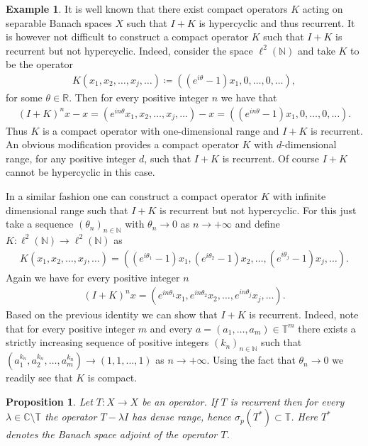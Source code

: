 \documentclass[12pt,leqno]{amsart}
\theoremstyle{plain}
\newtheorem{proposition}[equation]{Proposition}
\theoremstyle{definition}
\newtheorem{example}[equation]{Example}
\numberwithin{equation}{section}
\begin{document}
\begin{example}
	\label{ex.compact} It is well known that there exist compact operators $K$ acting on separable Banach spaces $X$ such that $I+K$ is hypercyclic and thus recurrent. It is however not difficult to construct a compact operator $K$ such that $I+K$ is recurrent but not hypercyclic. Indeed, consider the space $\ell^2(\mathbb N)$ and take $K$ to be the operator 
	\begin{align*}
		K(x_1,x_2,\ldots,x_j,\ldots)\coloneqq ((e^{i\theta}-1) x_1,0,\ldots,0,\ldots), 
	\end{align*}
	for some $\theta\in \mathbb R$. Then for every positive integer $n$ we have that 
	\begin{align*}
		(I+K)^n x -x= (e^{in\theta}x_1,x_2,\ldots,x_j,\ldots)-x=( (e^{in \theta}-1)x_1,0,\ldots,0,\ldots). 
	\end{align*}
	Thus $K$ is a compact operator with one-dimensional range and $I+K$ is recurrent. An obvious modification provides a compact operator $K$ with $d$-dimensional range, for any positive integer $d$, such that $I+K$ is recurrent. Of course $I+K$ cannot be hypercyclic in this case.
	
	In a similar fashion one can construct a compact operator $K$ with infinite dimensional range such that $I+K$ is recurrent but not hypercyclic. For this just take a sequence $(\theta_n)_{n\in\mathbb N}$ with $\theta_n\to 0$ as $n\to +\infty$ and define $K:\ell^2(\mathbb N)\to \ell^2(\mathbb N)$ as 
	\begin{align*}
		K(x_1,x_2,\ldots,x_j,\ldots)=((e^{i\theta_1}-1)x_1,(e^{i\theta_2}-1)x_2,\ldots,(e^{i\theta_j}-1)x_j,\ldots). 
	\end{align*}
	Again we have for every positive integer $n$ 
	\begin{align*}
		(I+K)^nx=(e^{in \theta_1}x_1,e^{in \theta_2}x_2,\ldots,e^{in \theta_j}x_j,\ldots). 
	\end{align*}
	Based on the previous identity we can show that $I+K$ is recurrent. Indeed, note that for every positive integer $m$ and every $a=(a_1,\ldots,a_m)\in \mathbb T^m$ there exists a strictly increasing sequence of positive integers $(k_n)_{n\in\mathbb N}$ such that $(a_1 ^{k_n},a_2 ^{k_n},\ldots,a_m ^{k_n})\to (1,1,\ldots,1)$ as $n\to +\infty$. Using the fact that $\theta_n\to 0$ we readily see that $K$ is compact. 
\end{example}

\begin{proposition}
	\label{p.pspectrum} Let $T:X\to X$ be an operator. If $T$ is recurrent then for every $\lambda \in \mathbb{C}\setminus \mathbb T$ the operator $T-\lambda I$ has dense range, hence $\sigma_p(T^*)\subset \mathbb T$. Here $T^*$ denotes the Banach space adjoint of the operator $T$. 
\end{proposition}
\end{document}
